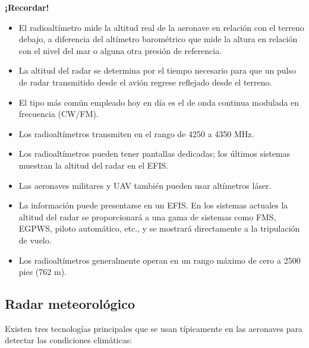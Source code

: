 \begin{tcolorbox} {\bf \large ¡Recordar!}{ \small
    \begin{itemize}

    \item El radioalt\'imetro mide la altitud real de la aeronave en
      relación con el terreno debajo, a diferencia del altímetro
      barom\'etrico que mide la altura en relación con el nivel del
      mar o alguna otra presi\'on de referencia.

    \item La altitud del radar se determina por el tiempo necesario
      para que un pulso de radar transmitido desde el avión regrese
      reflejado desde el terreno.

    \item El tipo m\'as com\'un empleado hoy en día es el de onda
      continua modulada en frecuencia (CW/FM).

    \item Los radioalt\'imetros transmiten en el rango de 4250 a 4350
      MHz.

    \item Los radioalt\'imetros pueden tener pantallas dedicadas; los
      últimos sistemas muestran la altitud del radar en el EFIS.

    \item Las aeronaves militares y UAV también pueden usar altímetros
      láser.

    \item La información puede presentarse en un EFIS. En los sistemas
      actuales la altitud del radar se proporcionará a una gama de
      sistemas como FMS, EGPWS, piloto automático, etc., y se mostrará
      directamente a la tripulación de vuelo.
 
    \item Los radioalt\'imetros generalmente operan en un rango máximo
      de cero a 2500 pies (762 m).

    \end{itemize}
}
  \end{tcolorbox}



 \subsection{Radar meteorol\'ogico}
 \label{sec:U06.06.radar.metereologico}

 Existen tres tecnologías principales que se usan típicamente en las aeronaves para detectar las condiciones climáticas:

